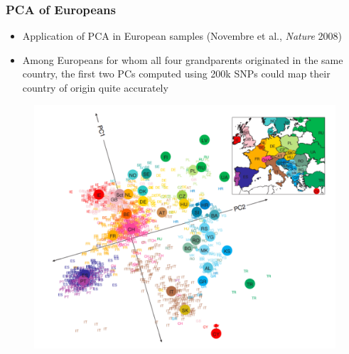\documentclass{beamer}
\begin{document}
\begin{frame}
	\frametitle{\bf PCA of Europeans }
\begin{minipage}{.5\textwidth}
	\begin{itemize}
	\item Application of PCA in European samples (Novembre et al., \textit{Nature} 2008)  
	\item Among Europeans for whom all four grandparents originated in the same country, the first two PCs computed using 200k SNPs could map their country of origin quite accurately
\end{itemize}
\end{minipage}%
\begin{minipage}{.5\textwidth}
	\begin{figure}
	\centering
	\includegraphics[scale = .2]{Figures/Europe_PCA.pdf}
\end{figure}
\end{minipage}


\end{frame}
\end{document}
